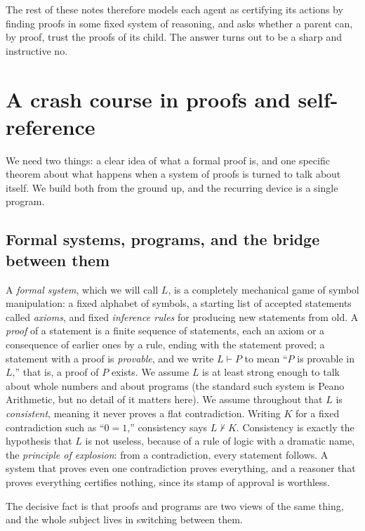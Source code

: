 \documentclass[10pt]{article}
\theoremstyle{definition}
\theoremstyle{remark}
\newcommand{\prov}{\vdash}            %
\begin{document}
The rest of these notes therefore models each agent as certifying its actions by finding proofs in some fixed system of reasoning, and asks whether a parent can, by proof, trust the proofs of its child. The answer turns out to be a sharp and instructive no.

\section{A crash course in proofs and self-reference}
\label{sec:logic}

We need two things: a clear idea of what a formal proof is, and one specific theorem about what happens when a system of proofs is turned to talk about itself. We build both from the ground up, and the recurring device is a single program.

\subsection{Formal systems, programs, and the bridge between them}
\label{sec:bridge}

A \emph{formal system}, which we will call $L$, is a completely mechanical game of symbol manipulation: a fixed alphabet of symbols, a starting list of accepted statements called \emph{axioms}, and fixed \emph{inference rules} for producing new statements from old. A \emph{proof} of a statement is a finite sequence of statements, each an axiom or a consequence of earlier ones by a rule, ending with the statement proved; a statement with a proof is \emph{provable}, and we write $L \prov P$ to mean ``$P$ is provable in $L$,'' that is, a proof of $P$ exists. We assume $L$ is at least strong enough to talk about whole numbers and about programs (the standard such system is Peano Arithmetic, but no detail of it matters here). We assume throughout that $L$ is \emph{consistent}, meaning it never proves a flat contradiction. Writing $K$ for a fixed contradiction such as ``$0=1$,'' consistency says $L \not\prov K$. Consistency is exactly the hypothesis that $L$ is not useless, because of a rule of logic with a dramatic name, the \emph{principle of explosion}: from a contradiction, every statement follows. A system that proves even one contradiction proves everything, and a reasoner that proves everything certifies nothing, since its stamp of approval is worthless.

The decisive fact is that proofs and programs are two views of the same thing, and the whole subject lives in switching between them.
\end{document}
